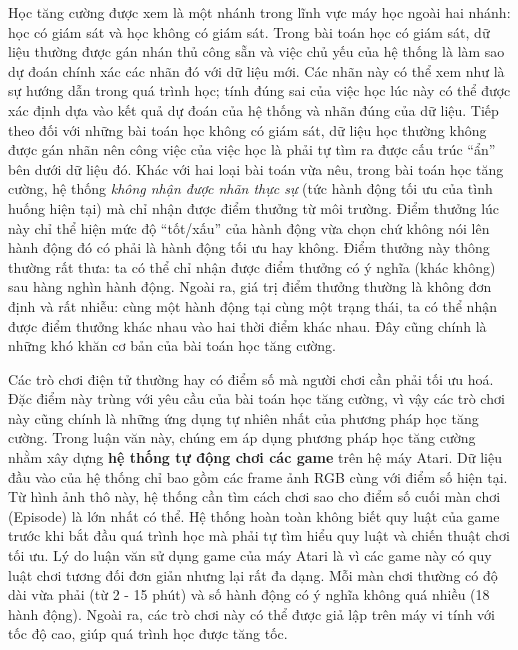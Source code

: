 Học tăng cường được xem là một nhánh trong lĩnh vực máy học ngoài hai nhánh: học có giám sát và học không có giám sát. 
Trong bài toán học có giám sát, dữ liệu thường được gán nhán thủ công sẵn và việc chủ yếu của hệ thống là làm sao dự đoán chính xác các nhãn đó với dữ liệu mới. 
Các nhãn này có thể xem như là sự hướng dẫn trong quá trình học; tính đúng sai của việc học lúc này có thể được xác định dựa vào kết quả dự đoán của hệ thống và nhãn đúng của dữ liệu. 
Tiếp theo đối với những bài toán học không có giám sát, dữ liệu học thường không được gán nhãn nên công việc của việc học là phải tự tìm ra được cấu trúc ``ẩn'' bên dưới dữ liệu đó. 
Khác với hai loại bài toán vừa nêu, trong bài toán học tăng cường, hệ thống \textit{không nhận được nhãn thực sự} (tức hành động tối ưu của tình huống hiện tại) mà chỉ nhận được điểm thưởng từ môi trường. 
Điểm thưởng lúc này chỉ thể hiện mức độ ``tốt/xấu'' của hành động vừa chọn chứ không nói lên hành động đó có phải là hành động tối ưu hay không. 
Điểm thưởng này thông thường rất thưa: ta có thể chỉ nhận được điểm thưởng có ý nghĩa (khác không) sau hàng nghìn hành động. 
Ngoài ra, giá trị điểm thưởng thường là không đơn định và rất nhiễu: cùng một hành động tại cùng một trạng thái, ta có thể nhận được điểm thưởng khác nhau vào hai thời điểm khác nhau. 
Đây cũng chính là những khó khăn cơ bản của bài toán học tăng cường.

Các trò chơi điện tử thường hay có điểm số mà người chơi cần phải tối ưu hoá. 
Đặc điểm này trùng với yêu cầu của bài toán học tăng cường, vì vậy các trò chơi này cũng chính là những ứng dụng tự nhiên nhất của phương pháp học tăng cường. 
Trong luận văn này, chúng em áp dụng phương pháp học tăng cường nhằm xây dựng \textbf{hệ thống tự động chơi các game} trên hệ máy Atari. 
Dữ liệu đầu vào của hệ thống chỉ bao gồm các frame ảnh RGB cùng với điểm số hiện tại. 
Từ hình ảnh thô này, hệ thống cần tìm cách chơi sao cho điểm số cuối màn chơi (Episode) là lớn nhất có thể. 
Hệ thống hoàn toàn không biết quy luật của game trước khi bắt đầu quá trình học mà phải tự tìm hiểu quy luật và chiến thuật chơi tối ưu. 
Lý do luận văn sử dụng game của máy Atari là vì các game này có quy luật chơi tương đối đơn giản nhưng lại rất đa dạng. 
Mỗi màn chơi thường có độ dài vừa phải (từ 2 - 15 phút) và số hành động có ý nghĩa không quá nhiều (18 hành động). 
Ngoài ra, các trò chơi này có thể được giả lập trên máy vi tính với tốc độ cao, giúp quá trình học được tăng tốc.

